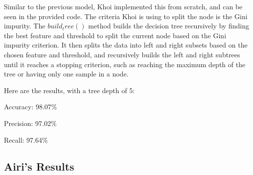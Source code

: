 Similar to the previous model, Khoi implemented this from scratch, and can be seen in the provided code. The criteria Khoi is using to split the node is the Gini impurity. The $build_tree()$ method builds the decision tree recursively by finding the best feature and threshold to split the current node based on the Gini impurity criterion. It then splits the data into left and right subsets based on the chosen feature and threshold, and recursively builds the left and right subtrees until it reaches a stopping criterion, such as reaching the maximum depth of the tree or having only one sample in a node.

Here are the results, with a tree depth of 5:

Accuracy: 98.07\%

Precision: 97.02\%

Recall: 97.64\%

\subsection{Airi's Results}
